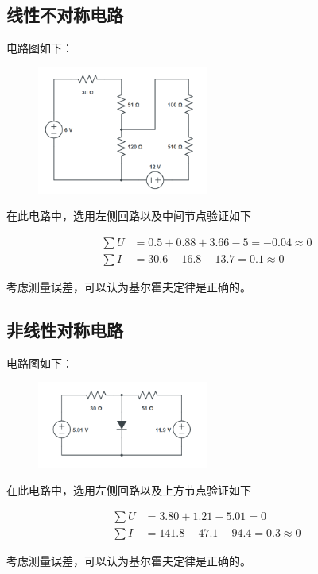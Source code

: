 \documentclass[a4paper,utf8]{article}
\begin{document}
    \subsection{线性不对称电路}
        电路图如下： \par
        \begin{figure}[!ht]
            \includegraphics[width=0.5\textwidth]{cir3.png}
        \end{figure}\par
        在此电路中，选用左侧回路以及中间节点验证如下\par
        \begin{align*}
            \sum U&= 0.5+0.88+3.66-5=-0.04\approx 0\\
            \sum I&= 30.6-16.8-13.7=0.1\approx 0
        \end{align*}\par
        考虑测量误差，可以认为基尔霍夫定律是正确的。

    \subsection{非线性对称电路}
        电路图如下： \par
        \begin{figure}[!ht]
            \includegraphics[width=0.5\textwidth]{cir4.png}
        \end{figure}\par
        在此电路中，选用左侧回路以及上方节点验证如下\par
        \begin{align*}
            \sum U&= 3.80+1.21-5.01=0\\
            \sum I&= 141.8-47.1-94.4=0.3\approx 0
        \end{align*}\par
        考虑测量误差，可以认为基尔霍夫定律是正确的。
\end{document}
